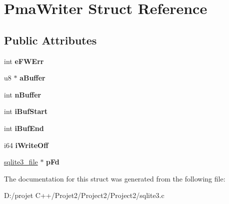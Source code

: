 \hypertarget{struct_pma_writer}{}\section{Pma\+Writer Struct Reference}
\label{struct_pma_writer}
\subsection*{Public Attributes}
\begin{DoxyCompactItemize}
\item 
\mbox{\label{struct_pma_writer_a3d74aff37c8abafd22ec8f8159d08725}} 
int {\bfseries e\+F\+W\+Err}
\item 
\mbox{\label{struct_pma_writer_ae53ada27501eb89a45409db4776f3b23}} 
u8 $\ast$ {\bfseries a\+Buffer}
\item 
\mbox{\label{struct_pma_writer_a5d8e651696b33ff6318e7d8473ee9e1b}} 
int {\bfseries n\+Buffer}
\item 
\mbox{\label{struct_pma_writer_ae77a80d66a5f3d40cd5d57861a455281}} 
int {\bfseries i\+Buf\+Start}
\item 
\mbox{\label{struct_pma_writer_ab15d816e53fb4496dd1e59094d4839a6}} 
int {\bfseries i\+Buf\+End}
\item 
\mbox{\label{struct_pma_writer_ad45a9271cbcdd0e506b81b77d2a744a5}} 
i64 {\bfseries i\+Write\+Off}
\item 
\mbox{\label{struct_pma_writer_a54606c98fb9e7318a55ed59de0e55550}} 
\mbox{\hyperlink{structsqlite3__file}{sqlite3\+\_\+file}} $\ast$ {\bfseries p\+Fd}
\end{DoxyCompactItemize}


The documentation for this struct was generated from the following file\+:\begin{DoxyCompactItemize}
\item 
D\+:/projet C++/\+Projet2/\+Project2/\+Project2/sqlite3.\+c\end{DoxyCompactItemize}
